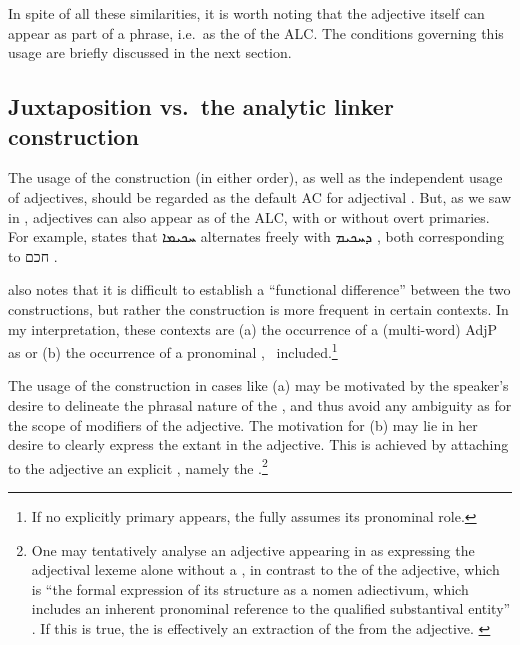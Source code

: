 {{{{In spite of all these similarities, it is worth noting that the adjective itself can appear as part of a \lnk* phrase, i.e.\ as the \secn of the ALC. The conditions governing this usage are briefly discussed in the next section.

\subsection{Juxtaposition vs.\ the analytic linker construction} \label{ss:syr_adj_vs}

The usage of the  construction (in either order), as well as the independent usage of adjectives, should be regarded as the default AC for adjectival \secns. But, as we saw in , adjectives can also appear as \secns of the ALC, with or without overt primaries. For example, \citet[211]{PeursenBenSira} states that \textsyriac{ܚܟܝܡܐ}  alternates freely with \textsyriac{ܕܚܟܝܡ} , both corresponding to  \texthebrew{חכם} . 

\citet[212]{PeursenBenSira} also notes that it is difficult to establish a \enquote{functional difference} between the two constructions, but rather the \lnk* construction is more frequent in certain contexts. In my interpretation, these contexts are (a) the occurrence of a (multi-word) AdjP as \secn or (b) the occurrence of a pronominal \prim, \zero\ included.\footnote{If no explicitly primary appears, the \lnk* fully assumes its pronominal role.} 

The usage of the \lnk* construction in cases like (a) may be motivated by the speaker's desire to delineate the phrasal nature of the \secn, and thus avoid any ambiguity as for the scope of modifiers of the adjective. The motivation for (b) may lie in her desire to clearly express the  extant in the adjective. This is achieved by attaching to the adjective an explicit , namely the \lnk*.\footnote{One may tentatively analyse an adjective appearing in \abs* as expressing the adjectival lexeme alone without a , in contrast to the \emp* of the adjective, which is \enquote{the formal expression of its structure as a nomen adiectivum, which includes an inherent pronominal reference to the qualified substantival entity} \citep[718]{GoldenbergPredicative}. If this is true, the \lnk* is effectively an extraction of the  from the adjective. \label{ft:syr_abs_adj}}


}}}}
